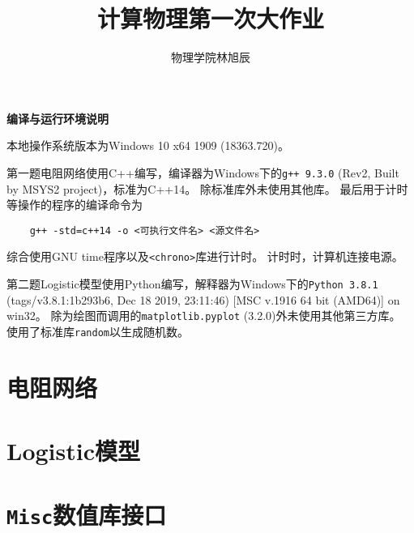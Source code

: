 \documentclass[a4paper,unicode]{report}
\title{计算物理第一次大作业}
\author{物理学院\quad 林旭辰\quad 1800011324}
\newcommand{\chapterendname}{章}
\begin{document}
\maketitle
\tableofcontents

\begin{center}
    \textbf{编译与运行环境说明}
\end{center}

本地操作系统版本为\textsf{Windows 10 x64 1909 (18363.720)}。

第一题电阻网络使用\textsf{C++}编写，编译器为Windows下的\texttt{g++ 9.3.0} (Rev2, Built by MSYS2 project)，标准为\textsf{C++14}。
除标准库外未使用其他库。
最后用于计时等操作的程序的编译命令为\begin{verbatim}
    g++ -std=c++14 -o <可执行文件名> <源文件名>
\end{verbatim}
综合使用\textsf{GNU time}程序以及\texttt{<chrono>}库进行计时。
计时时，计算机连接电源。

第二题Logistic模型使用\textsf{Python}编写，解释器为Windows下的\texttt{Python 3.8.1} (tags/v3.8.1:1b293b6, Dec 18 2019, 23:11:46) [MSC v.1916 64 bit (AMD64)] on win32。
除为绘图而调用的\texttt{matplotlib.pyplot} (3.2.0)外未使用其他第三方库。
使用了标准库\texttt{random}以生成随机数。

\chapter{电阻网络}


\chapter{Logistic模型}


\appendix
\renewcommand\chapterendname{}

\chapter{\texttt{Misc}数值库接口}

\end{document}
